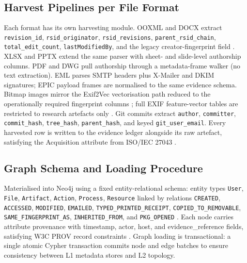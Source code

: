 \subsection{Harvest Pipelines per File Format}

Each format has its own harvesting module. OOXML and DOCX extract \texttt{revision\_\allowbreak id}, \texttt{rsid\_\allowbreak originator}, \texttt{rsid\_\allowbreak revisions}, \texttt{parent\_\allowbreak rsid\_\allowbreak chain}, \texttt{total\_\allowbreak edit\_\allowbreak count}, \texttt{lastModifiedBy}, and the legacy creator-fingerprint field \citep{didriksen2014ooxml, fu2015docx}. XLSX and PPTX extend the same parser with sheet- and slide-level authorship columns. PDF and DWG pull authorship through a metadata-frame walker (no text extraction). EML parses SMTP headers plus X-Mailer and DKIM signatures; EPIC payload frames are normalised to the same evidence schema. Bitmap images mirror the Exif2Vec vectorisation path reduced to the operationally required fingerprint columns \citep{umair2024exif2vec}; full EXIF feature-vector tables are restricted to research artefacts only \citep{yasenenko2025evaluating}. Git commits extract \texttt{author}, \texttt{committer}, \texttt{commit\_\allowbreak hash}, \texttt{tree\_\allowbreak hash}, \texttt{parent\_\allowbreak hash}, and keyed \texttt{git\_\allowbreak user\_\allowbreak email}. Every harvested row is written to the evidence ledger alongside its raw artefact, satisfying the Acquisition attribute from ISO/IEC 27043 \citep{shoderu2025dfrsaas, shoderu2026dfrconference}.

\subsection{Graph Schema and Loading Procedure}

Materialised into Neo4j using a fixed entity-relational schema: entity types \texttt{User}, \texttt{File}, \texttt{Artifact}, \texttt{Action}, \texttt{Process}, \texttt{Resource} linked by relations \texttt{CREATED}, \texttt{ACCESSED}, \texttt{MODIFIED}, \texttt{EMAILED}, \texttt{TYPED\_\allowbreak PRINTED\_\allowbreak RECEIPT}, \texttt{COPIED\_\allowbreak TO\_\allowbreak REMOVABLE}, \texttt{SAME\_\allowbreak FINGERPRINT\_\allowbreak AS}, \texttt{INHERITED\_\allowbreak FROM}, and \texttt{PKG\_\allowbreak OPENED} \citep{li2021threat, yusof2025provcon}. Each node carries attribute provenance with timestamp, actor, host, and evidence\_reference fields, satisfying W3C PROV record constraints \citep{mavroeidis2018framework}. Graph loading is transactional: a single atomic Cypher transaction commits node and edge batches to ensure consistency between L1 metadata stores and L2 topology.


